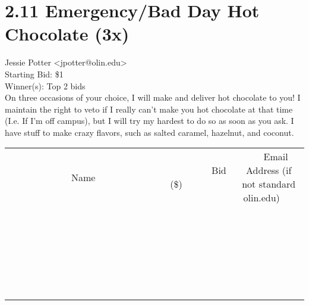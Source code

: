 \documentclass[11pt]{article}
\begin{document}
					\section*{2.11 Emergency/Bad Day Hot Chocolate (3x)}
					Jessie Potter <jpotter@olin.edu> \\
					Starting Bid: \$1 \\
					Winner(s): Top 2 bids \\
					On three occasions of your choice, I will make and deliver hot chocolate to you! I maintain the right to veto if I really can't make you hot chocolate at that time (I.e. If I'm off campus), but I will try my hardest to do so as soon as you ask. I have stuff to make crazy flavors, such as salted caramel, hazelnut, and coconut. \\
					[6ex]
					\begin{tabular}{c c c}
						~~~~~~~~~~~~~Name~~~~~~~~~~~~~ & ~~~~~~~~~Bid (\$)~~~~~~~~~ & ~~~Email Address (if not standard olin.edu)~~~ \\
				
 & & \\
\hline
 & & \\
\hline
 & & \\
\hline
 & & \\
\hline
 & & \\
\hline
 & & \\
\hline
 & & \\
\hline
 & & \\
\hline
 & & \\
\hline
 & & \\
\hline
 & & \\
\hline
 & & \\
\hline
 & & \\
\hline
 & & \\
\hline
 & & \\
\hline
 & & \\
\hline
 & & \\
\hline
 & & \\
\hline
 & & \\
\hline
 & & \\
\hline
 & & \\
\hline
 & & \\
\hline
 & & \\
\hline
 & & \\
\hline
 & & \\
\hline
 & & \\
\hline
					\end{tabular}
					\clearpage
				
\end{document}
